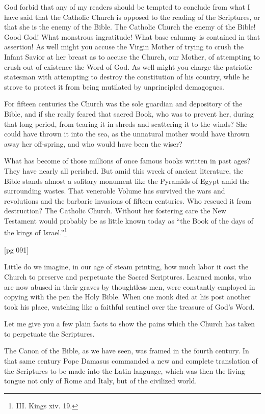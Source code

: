 God forbid that any of my readers should be
tempted to conclude from what I have said that
the Catholic Church is opposed to the reading of
the Scriptures, or that she is the enemy of the
Bible. The Catholic Church the enemy of the
Bible! Good God! What monstrous ingratitude!
What base calumny is contained in that assertion!
As well might you accuse the Virgin Mother of
trying to crush the Infant Savior at her breast
as to accuse the Church, our Mother, of attempting
to crush out of existence the Word of God.
As well might you charge the patriotic statesman
with attempting to destroy the constitution of his
country, while he strove to protect it from being
mutilated by unprincipled demagogues.

For fifteen centuries the Church was the sole
guardian and depository of the Bible, and if she
really feared that sacred Book, who was to prevent
her, during that long period, from tearing it
in shreds and scattering it to the winds? She
could have thrown it into the sea, as the unnatural
mother would have thrown away her off-spring,
and who would have been the wiser?

What has become of those millions of once
famous books written in past ages? They have
nearly all perished. But amid this wreck of ancient
literature, the Bible stands almost a solitary
monument like the Pyramids of Egypt amid
the surrounding wastes. That venerable Volume
has survived the wars and revolutions and the
barbaric invasions of fifteen centuries. Who rescued
it from destruction? The Catholic Church.
Without her fostering care the New Testament
would probably be as little known today as “the
Book of the days of the kings of Israel.”\footnote{III.
Kings xiv. 19.}

[pg 091]

Little do we imagine, in our age of steam printing,
how much labor it cost the Church to preserve
and perpetuate the Sacred Scriptures. Learned
monks, who are now abused in their graves by
thoughtless men, were constantly employed in
copying with the pen the Holy Bible. When one
monk died at his post another took his place,
watching like a faithful sentinel over the treasure
of God's Word.

Let me give you a few plain facts to show the
pains which the Church has taken to perpetuate
the Scriptures.

The Canon of the Bible, as we have seen, was
framed in the fourth century. In that same century
Pope Damasus commanded a new and complete
translation of the Scriptures to be made into
the Latin language, which was then the living
tongue not only of Rome and Italy, but of the
civilized world.

